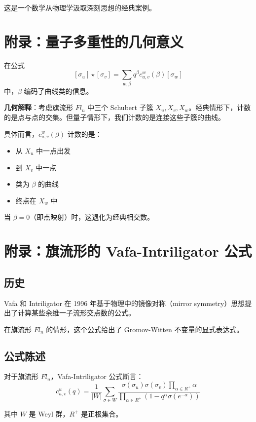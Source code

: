 这是一个数学从物理学汲取深刻思想的经典案例。

\section{附录：量子多重性的几何意义}
\label{sec:quantum-multiplicity-meaning}

在公式
$$[\sigma_u] \star [\sigma_v] = \sum_{w,\beta} q^{\beta} c^w_{u,v}(\beta) [\sigma_w]$$
中，$\beta$ 编码了曲线类的信息。

\textbf{几何解释}：考虑旗流形 $Fl_n$ 中三个 Schubert 子簇 $X_u, X_v, X_w$。经典情形下，计数的是点与点的交集。但量子情形下，我们计数的是连接这些子簇的曲线。

具体而言，$c^w_{u,v}(\beta)$ 计数的是：
\begin{itemize}
\item 从 $X_u$ 中一点出发
\item 到 $X_v$ 中一点
\item 类为 $\beta$ 的曲线
\item 终点在 $X_w$ 中
\end{itemize}

当 $\beta = 0$（即点映射）时，这退化为经典相交数。

\section{附录：旗流形的 Vafa-Intriligator 公式}
\label{sec:vafa-intriligator-detail}

\subsection*{历史}

Vafa 和 Intriligator 在 1996 年基于物理中的镜像对称（mirror symmetry）思想提出了计算某些余维一子流形交点数的公式。

在旗流形 $Fl_n$ 的情形，这个公式给出了 Gromov-Witten 不变量的显式表达式。

\subsection*{公式陈述}

对于旗流形 $Fl_n$，Vafa-Intriligator 公式断言：
$$c_{u,v}^w(q) = \frac{1}{|W|} \sum_{\sigma \in W} \frac{\sigma(\sigma_u) \sigma(\sigma_v) \prod_{\alpha \in R^+} \alpha}{\prod_{\alpha \in R^+} (1 - q^\alpha \sigma(e^{-\alpha}))}$$

其中 $W$ 是 Weyl 群，$R^+$ 是正根集合。

